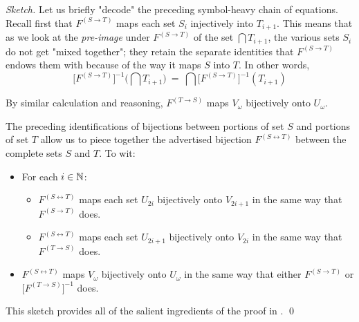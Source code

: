 \begin{proof}[Sketch]
\smallskip

Let us briefly "decode" the preceding symbol-heavy chain of equations.
Recall first that $F^{(S \rightarrow T)}$ maps each set $S_i$
injectively into $T_{i+1}$.  This means that as we look at the {\em
  pre-image} under $F^{(S \rightarrow T)}$ of the set $\bigcap
T_{i+1}$, the various sets $S_i$ do not get "mixed together"; they
retain the separate identities that $F^{(S \rightarrow T)}$ endows
them with because of the way it maps $S$ into $T$.  In other words,
\[ \Big[F^{(S \rightarrow T)}\Big]^{-1} \Big(\bigcap T_{i+1} \Big) \ = \
\bigcap \Big[F^{(S \rightarrow T)}\Big]^{-1} (T_{i+1}) \]


\smallskip

\noindent
By similar calculation and reasoning, 
$F^{(T \rightarrow S)}$ maps $V_\omega$ bijectively onto $U_\omega$.

\medskip

The preceding identifications of bijections between portions of set
$S$ and portions of set $T$ allow us to piece together the advertised
bijection $F^{(S \leftrightarrow T)}$ between the complete sets $S$
and $T$.  To wit:
\begin{itemize}
\item
For each $i \in \mathbb{N}$:
  \begin{itemize}
  \item
$F^{(S \leftrightarrow T)}$ maps each set $U_{2i}$ bijectively onto
$V_{2i+1}$ in the same way that $F^{(S \rightarrow T)}$ does.
  \item
$F^{(S \leftrightarrow T)}$ maps each set $U_{2i+1}$ bijectively onto
$V_{2i}$ in the same way that $F^{(T \rightarrow S)}$ does.
\end{itemize}

\item
$F^{(S \leftrightarrow T)}$ maps $V_\omega$ bijectively onto
  $U_\omega$ in the same way that either $F^{(S \rightarrow T)}$ or
  $\Big[F^{(T \rightarrow S)}\Big]^{-1}$ does.
\end{itemize}
This sketch provides all of the salient ingredients of the proof in \cite{Tonien07}.  \qed
\end{proof}

\bigskip

